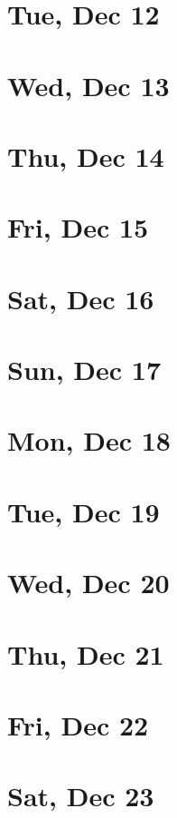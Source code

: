 	\section{Tue, Dec 12}
		
	\section{Wed, Dec 13}
		
	\section{Thu, Dec 14}
		
	\section{Fri, Dec 15}
		
	\section{Sat, Dec 16}
		
	\section{Sun, Dec 17}
		
	\section{Mon, Dec 18}
		
	\section{Tue, Dec 19}
		
	\section{Wed, Dec 20}
		
	\section{Thu, Dec 21}
		
	\section{Fri, Dec 22}
		
	\section{Sat, Dec 23}
		
